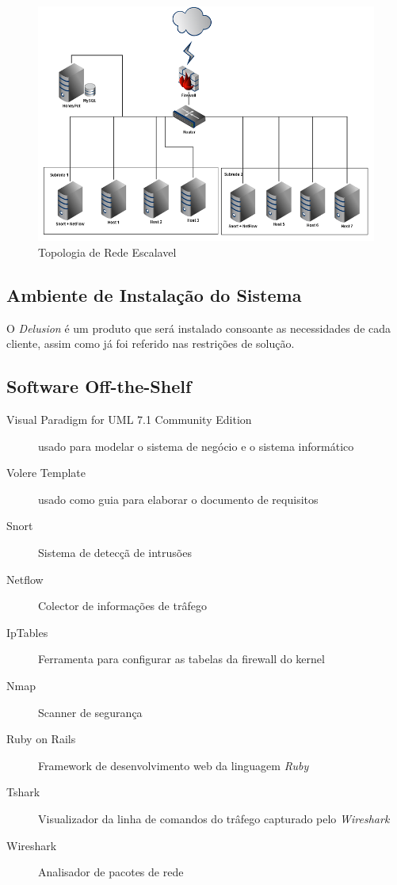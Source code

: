 \begin{figure}
	\centering	
	\includegraphics[scale=0.6]{images/topologia3.png}
	\caption{Topologia de Rede Escalavel}
    \label{img:topo2}
\end{figure}


\subsection{Ambiente de Instalação do Sistema}

    O \textit{Delusion} é um produto que será instalado consoante as necessidades de cada cliente, assim como já foi referido nas restrições de solução.

\subsection{Software Off-the-Shelf}
\begin{description}
    \item [Visual Paradigm for UML 7.1 Community Edition] usado para modelar o sistema de negócio e o sistema informático
    \item [Volere Template] usado como guia para elaborar o documento de requisitos
    \item [Snort] Sistema de detecçã de intrusões
    \item [Netflow] Colector de informações de trâfego
    \item [IpTables] Ferramenta para configurar as tabelas da firewall do kernel
    \item [Nmap] Scanner de segurança
    \item [Ruby on Rails] Framework de desenvolvimento web da linguagem \textit{Ruby}
    \item [Tshark] Visualizador da linha de comandos do trâfego capturado pelo \textit{Wireshark}
    \item [Wireshark] Analisador de pacotes de rede
\end{description}

